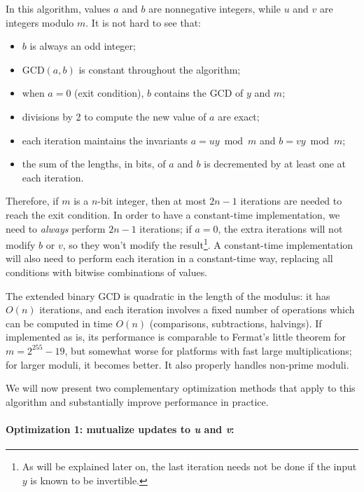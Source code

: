 \documentclass{llncs}
\begin{document}
In this algorithm, values $a$ and $b$ are nonnegative integers, while
$u$ and $v$ are integers modulo $m$. It is not hard to see that:
\begin{itemize}
    \item $b$ is always an odd integer;
    \item $\text{GCD}(a, b)$ is constant throughout the algorithm;
    \item when $a = 0$ (exit condition), $b$ contains the GCD of $y$
    and $m$;
    \item divisions by 2 to compute the new value of $a$ are exact;
    \item each iteration maintains the invariants $a = uy \bmod m$ and
    $b = vy \bmod m$;
    \item the sum of the lengths, in bits, of $a$ and $b$ is decremented
    by at least one at each iteration.
\end{itemize}
Therefore, if $m$ is a $n$-bit integer, then at most $2n-1$ iterations
are needed to reach the exit condition. In order to have a constant-time
implementation, we need to \emph{always} perform $2n-1$ iterations; if
$a = 0$, the extra iterations will not modify $b$ or $v$, so they won't
modify the result\footnote{As will be explained later on, the last
iteration needs not be done if the input $y$ is known to be
invertible.}. A constant-time implementation will also need to perform
each iteration in a constant-time way, replacing all conditions with
bitwise combinations of values.

The extended binary GCD is quadratic in the length of the modulus: it
has $O(n)$ iterations, and each iteration involves a fixed number of
operations which can be computed in time $O(n)$ (comparisons,
subtractions, halvings). If implemented as is, its performance is
comparable to Fermat's little theorem for $m = 2^{255}-19$, but somewhat
worse for platforms with fast large multiplications; for larger moduli,
it becomes better. It also properly handles non-prime moduli.

We will now present two complementary optimization methods that apply to
this algorithm and substantially improve performance in practice.

\paragraph{Optimization 1: mutualize updates to \emph{u} and \emph{v}:}
\end{document}
